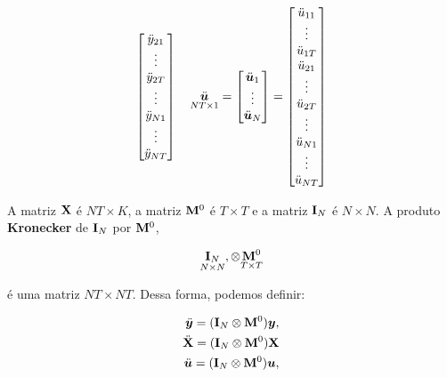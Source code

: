 \documentclass[11pt, oneside, a4paper, article]{article}
\numberwithin{equation}{section}
\begin{document}
\begin{align*}
\begin{bmatrix}
		\ddot{y}_{21} \\ \vdots \\ \ddot{y}_{2T} \\
		\vdots \\
		\ddot{y}_{N1} \\ \vdots \\ \ddot{y}_{NT} \\
	\end{bmatrix}
	\quad
	\underset{NT \times 1}{\ddot{\boldsymbol{u}}} = 
	\begin{bmatrix}
		\ddot{\boldsymbol{u}}_{1} \\ \vdots \\ \ddot{\boldsymbol{u}}_{N}
	\end{bmatrix}
	=
	\begin{bmatrix}
		\ddot{u}_{11} \\ \vdots \\ \ddot{u}_{1T} \\
		\ddot{u}_{21} \\ \vdots \\ \ddot{u}_{2T} \\
		\vdots \\
		\ddot{u}_{N1} \\ \vdots \\ \ddot{u}_{NT} \\
	\end{bmatrix}
\end{align*}


\vspace{1 em}
\noindent
A matriz $\mathbf{X}$ é $NT \times K$, a matriz $\mathbf{M}^{0}$ é $T \times T$ e a matriz $\mathbf{I}_{N}$ é $N \times N$.
A produto \textbf{Kronecker} de $\mathbf{I}_{N}$ por $\mathbf{M}^{0}$,

\vspace{-1 em}
\begin{align*}
	\underset{N \times N}{\mathbf{I}_{N}},
	\otimes
	\underset{T \times T}{\mathbf{M}^{0}}
\end{align*}

\noindent
é uma matriz $NT \times NT$.
Dessa forma, podemos definir:

\vspace{-1 em}
\begin{align*}
	\ddot{\boldsymbol{y}} = ( \mathbf{I}_{N} \otimes \mathbf{M}^{0} ) \boldsymbol{y},
	\\
	\ddot{\mathbf{X}} = ( \mathbf{I}_{N} \otimes \mathbf{M}^{0} ) \mathbf{X}
	\\
	\ddot{\boldsymbol{u}} = ( \mathbf{I}_{N} \otimes \mathbf{M}^{0} ) \boldsymbol{u},
\end{align*}
\end{document}
